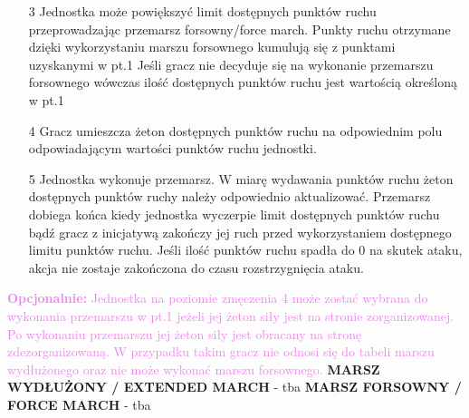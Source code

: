 \begin{itemize}
	\item[3] Jednostka może powiększyć limit dostępnych punktów ruchu przeprowadzając przemarsz forsowny/force march. Punkty ruchu otrzymane dzięki wykorzystaniu marszu forsownego kumulują się z punktami uzyskanymi w pt.1 Jeśli gracz nie decyduje się na wykonanie przemarszu forsownego wówczas ilość dostępnych punktów ruchu jest wartością określoną w pt.1
	\item[4] Gracz umieszcza żeton dostępnych punktów ruchu na odpowiednim polu odpowiadającym wartości punktów ruchu jednostki.
	\item[5] Jednostka wykonuje przemarsz. W miarę wydawania punktów ruchu żeton dostępnych punktów ruchy należy odpowiednio aktualizować. Przemarsz dobiega końca kiedy jednostka wyczerpie limit dostępnych punktów ruchu bądź gracz z inicjatywą zakończy jej ruch przed wykorzystaniem dostępnego limitu punktów ruchu. Jeśli ilość punktów ruchu spadła do 0 na skutek ataku, akcja nie zostaje zakończona do czasu rozstrzygnięcia ataku.
\end{itemize}
\textcolor{violet}{\textbf{Opcjonalnie: }Jednostka na poziomie zmęczenia 4 może zostać wybrana do wykonania przemarszu w pt.1 jeżeli jej żeton siły jest na stronie zorganizowanej. Po wykonaniu przemarszu jej żeton siły jest obracany na stronę zdezorganizowaną. W przypadku takim gracz nie odnosi się do tabeli marszu wydłużonego oraz nie może wykonać marszu forsownego.}
\bigbreak
\textbf{MARSZ WYDŁUŻONY / EXTENDED MARCH} - tba
\bigbreak
\textbf{MARSZ FORSOWNY / FORCE MARCH} - tba